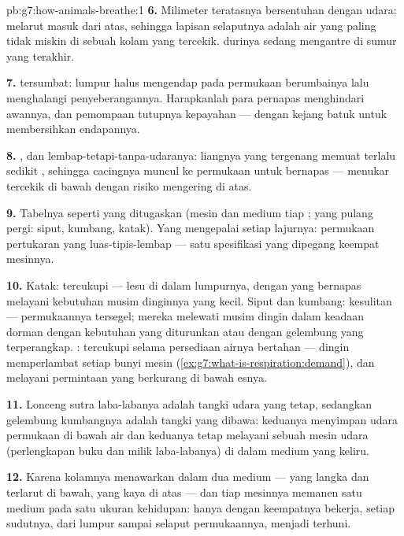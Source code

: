 \begin{solution}{pb:g7:how-animals-breathe:1}
\textbf{6.} Milimeter teratasnya bersentuhan dengan udara: 
melarut masuk dari atas, sehingga lapisan selaputnya adalah air yang
paling tidak miskin di sebuah kolam yang tercekik.  durinya sedang
mengantre di sumur yang terakhir.

\textbf{7.}  tersumbat: lumpur halus mengendap pada permukaan
berumbainya lalu menghalangi penyeberangannya. Harapkanlah para
pernapas  menghindari awannya, dan pemompaan tutupnya
kepayahan --- dengan kejang batuk untuk membersihkan endapannya.

\textbf{8.} , dan  lembap-tetapi-tanpa-udaranya:
liangnya yang tergenang memuat terlalu sedikit , sehingga
cacingnya muncul ke permukaan untuk bernapas --- menukar tercekik di
bawah dengan risiko mengering di atas.

\textbf{9.} Tabelnya seperti yang ditugaskan (mesin dan medium tiap
; yang pulang pergi: siput, kumbang, katak). Yang mengepalai
setiap lajurnya: permukaan pertukaran yang luas-tipis-lembap ---
satu spesifikasi yang dipegang keempat mesinnya.

\textbf{10.} Katak: tercukupi --- lesu di dalam lumpurnya, dengan
 yang bernapas melayani kebutuhan musim dinginnya yang kecil.
Siput dan kumbang: kesulitan --- permukaannya tersegel; mereka
melewati musim dingin dalam keadaan dorman dengan kebutuhan yang
diturunkan atau dengan gelembung yang terperangkap. : tercukupi
selama persediaan airnya bertahan --- dingin memperlambat setiap bunyi
mesin (\cref{ex:g7:what-is-respiration:demand}), dan 
melayani permintaan yang berkurang di bawah esnya.

\textbf{11.} Lonceng sutra laba-labanya adalah tangki udara yang
tetap, sedangkan gelembung kumbangnya adalah tangki yang dibawa:
keduanya menyimpan udara permukaan di bawah air dan keduanya tetap
melayani sebuah mesin udara (perlengkapan  buku dan 
milik laba-labanya) di dalam medium yang keliru.

\textbf{12.} Karena kolamnya menawarkan  dalam dua medium ---
yang langka dan terlarut di bawah, yang kaya di atas --- dan tiap
mesinnya memanen satu medium pada satu ukuran kehidupan: hanya dengan
keempatnya bekerja, setiap sudutnya, dari lumpur sampai selaput
permukaannya, menjadi terhuni.
\end{solution}
